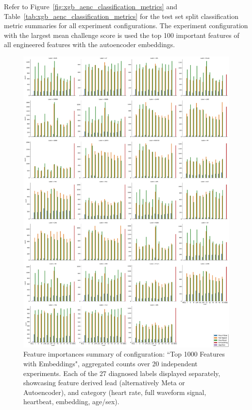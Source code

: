 \documentclass[\main/thesis.tex]{subfiles}
\begin{document}
Refer to Figure~\ref{fig:xgb_aenc_classification_metrics} and Table~\ref{tab:xgb_aenc_classification_metrics} for the test set split classification metric summaries for all experiment configurations.
The experiment configuration with the largest mean challenge score is used the top 100 important features of all engineered features with the autoencoder embeddings.

\begin{figure}[t]
    \centering
    \includegraphics[width=\textwidth]{figure/top_1000_feature_importances_all_w_embedding.pdf}
    \caption{Feature importances summary of configuration: ``Top 1000 Features with Embeddings", aggregated counts over 20 independent experiments. Each of the 27 diagnosed labels displayed separately, showcasing feature derived lead (alternatively Meta or Autoencoder), and category (heart rate, full waveform signal, heartbeat, embedding, age/sex).}
    \label{fig:xgb_aenc_top_1000_features_labelwise}
\end{figure}
\end{document}
